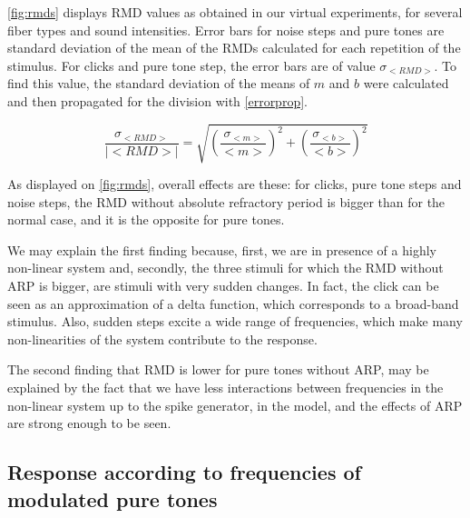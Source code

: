 \autoref{fig:rmds} displays RMD values as obtained in our virtual experiments, 
for several fiber types and sound intensities. 
Error bars for noise steps and pure tones are standard deviation of the mean of the RMDs calculated for each repetition of the stimulus. 
For clicks and pure tone step, the error bars are of value $\sigma_{< RMD >}$. To find this value, the standard deviation of the means of $m$ and $b$ were calculated and then propagated for the division with \autoref{errorprop}.

\begin{equation}\label{errorprop}\frac{\sigma_{< RMD >}}{|<RMD>|}= \sqrt{\left(\frac{\sigma_{< m >}}{< m >}\right)^2 + \left(\frac{\sigma_{< b >}}{< b >}\right)^2} \end{equation}
 
As displayed on \autoref{fig:rmds}, overall effects are these:
for clicks, pure tone steps and noise steps, the RMD without absolute refractory
period is bigger than for the normal case, and it is the opposite for pure tones.


We may explain the first finding because, first, we are in presence of a highly 
non-linear system and, 
secondly, the three stimuli for which the RMD without ARP is bigger, 
are stimuli with very sudden changes. 
In fact, the click can be seen as an approximation of a delta function, 
which corresponds to a broad-band stimulus. 
Also, sudden steps excite a wide range of frequencies, 
which make many non-linearities of the system contribute to the response.


The second finding that RMD is lower for pure tones without ARP, 
may be explained by the fact that we have less 
interactions between frequencies in the non-linear system up to the spike generator, 
in the model,
and the effects of ARP are strong enough to be seen.

\subsection{Response according to frequencies of modulated pure tones}

